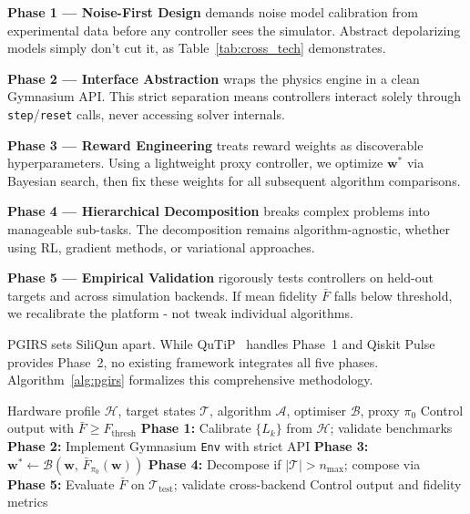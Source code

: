 \textbf{Phase 1 — Noise-First Design} demands noise model calibration from experimental data before any controller sees the simulator. Abstract depolarizing models simply don't cut it, as Table~\ref{tab:cross_tech} demonstrates.

\textbf{Phase 2 — Interface Abstraction} wraps the physics engine in a clean Gymnasium API. This strict separation means controllers interact solely through \texttt{step}/\texttt{reset} calls, never accessing solver internals.

\textbf{Phase 3 — Reward Engineering} treats reward weights as discoverable hyperparameters. Using a lightweight proxy controller, we optimize $\mathbf{w}^*$ via Bayesian search, then fix these weights for all subsequent algorithm comparisons.

\textbf{Phase 4 — Hierarchical Decomposition} breaks complex problems into manageable sub-tasks. The decomposition remains algorithm-agnostic, whether using RL, gradient methods, or variational approaches.

\textbf{Phase 5 — Empirical Validation} rigorously tests controllers on held-out targets and across simulation backends. If mean fidelity $\bar{F}$ falls below threshold, we recalibrate the platform - not tweak individual algorithms.

PGIRS sets SiliQun apart. While QuTiP~\cite{Johansson2012,Johansson2013} handles Phase~1 and Qiskit Pulse~\cite{Alexander2020} provides Phase~2, no existing framework integrates all five phases. Algorithm~\ref{alg:pgirs} formalizes this comprehensive methodology.

\begin{algorithm}[t]
\caption{Physics-Grounded Iterative Refinement Stack (PGIRS)}
\label{alg:pgirs}
\begin{algorithmic}[1]
\Require Hardware profile $\mathcal{H}$, target states $\mathcal{T}$, algorithm $\mathcal{A}$, optimiser $\mathcal{B}$, proxy $\pi_0$
\Ensure Control output with $\bar{F} \geq F_{\text{thresh}}$
\State \textbf{Phase 1:} Calibrate $\{L_k\}$ from $\mathcal{H}$; validate benchmarks
\State \textbf{Phase 2:} Implement Gymnasium \texttt{Env} with strict API
\State \textbf{Phase 3:} $\mathbf{w}^* \leftarrow \mathcal{B}\!\left(\mathbf{w},\, \bar{F}_{\pi_0}(\mathbf{w})\right)$
\State \textbf{Phase 4:} Decompose if $|\mathcal{T}| > n_{\text{max}}$; compose via~\cite{Briegel1998}
\State \textbf{Phase 5:} Evaluate $\bar{F}$ on $\mathcal{T}_{\text{test}}$; validate cross-backend
\State \Return Control output and fidelity metrics
\end{algorithmic}
\end{algorithm}

